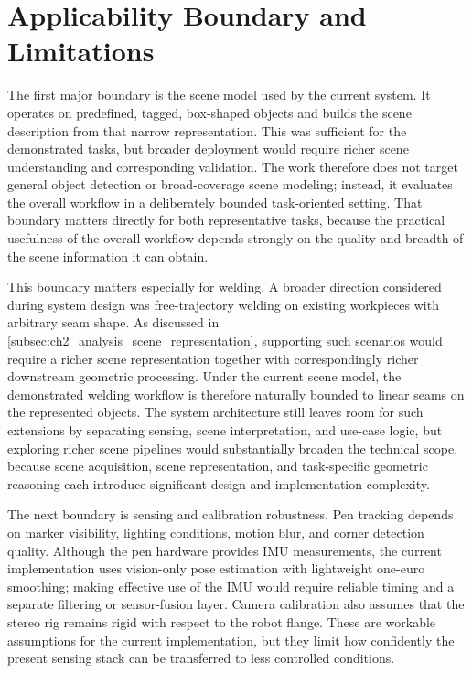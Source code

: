 \section{Applicability Boundary and Limitations}

The first major boundary is the scene model used by the current system. It operates on predefined, tagged, box-shaped objects and builds the scene description from that narrow representation. This was sufficient for the demonstrated tasks, but broader deployment would require richer scene understanding and corresponding validation. The work therefore does not target general object detection or broad-coverage scene modeling; instead, it evaluates the overall workflow in a deliberately bounded task-oriented setting. That boundary matters directly for both representative tasks, because the practical usefulness of the overall workflow depends strongly on the quality and breadth of the scene information it can obtain.

This boundary matters especially for welding. A broader direction considered during system design was free-trajectory welding on existing workpieces with arbitrary seam shape. As discussed in \autoref{subsec:ch2_analysis_scene_representation}, supporting such scenarios would require a richer scene representation together with correspondingly richer downstream geometric processing. Under the current scene model, the demonstrated welding workflow is therefore naturally bounded to linear seams on the represented objects. The system architecture still leaves room for such extensions by separating sensing, scene interpretation, and use-case logic, but exploring richer scene pipelines would substantially broaden the technical scope, because scene acquisition, scene representation, and task-specific geometric reasoning each introduce significant design and implementation complexity.

The next boundary is sensing and calibration robustness. Pen tracking depends on marker visibility, lighting conditions, motion blur, and corner detection quality. Although the pen hardware provides IMU measurements, the current implementation uses vision-only pose estimation with lightweight one-euro smoothing; making effective use of the IMU would require reliable timing and a separate filtering or sensor-fusion layer. Camera calibration also assumes that the stereo rig remains rigid with respect to the robot flange. These are workable assumptions for the current implementation, but they limit how confidently the present sensing stack can be transferred to less controlled conditions.

